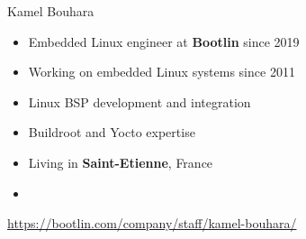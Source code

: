 \begin{frame}{Kamel Bouhara}
  \begin{itemize}
  \item Embedded Linux engineer at {\bf Bootlin} since 2019
  \item Working on embedded Linux systems since 2011
  \item Linux BSP development and integration
  \item Buildroot and Yocto expertise
  \item Living in {\bf Saint-Etienne}, France
  \item {}
  \end{itemize}
  {\small \url{https://bootlin.com/company/staff/kamel-bouhara/}}
\end{frame}

